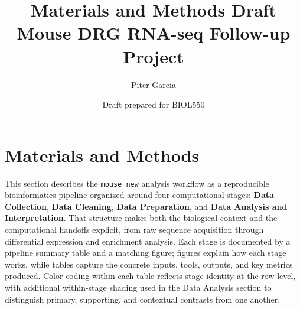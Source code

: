 \documentclass[12pt]{article}
\title{Materials and Methods Draft\\Mouse DRG RNA-seq Follow-up Project}
\author{Piter Garcia}
\date{Draft prepared for BIOL550}
\begin{document}
\maketitle


\section{Materials and Methods}


This section describes the \texttt{mouse\_new} analysis workflow as a reproducible bioinformatics pipeline organized around four computational stages: \textbf{Data Collection}, \textbf{Data Cleaning}, \textbf{Data Preparation}, and \textbf{Data Analysis and Interpretation}. That structure makes both the biological context and the computational handoffs explicit, from raw sequence acquisition through differential expression and enrichment analysis. Each stage is documented by a pipeline summary table and a matching figure; figures explain how each stage works, while tables capture the concrete inputs, tools, outputs, and key metrics produced. Color coding within each table reflects stage identity at the row level, with additional within-stage shading used in the Data Analysis section to distinguish primary, supporting, and contextual contrasts from one another.
\end{document}
